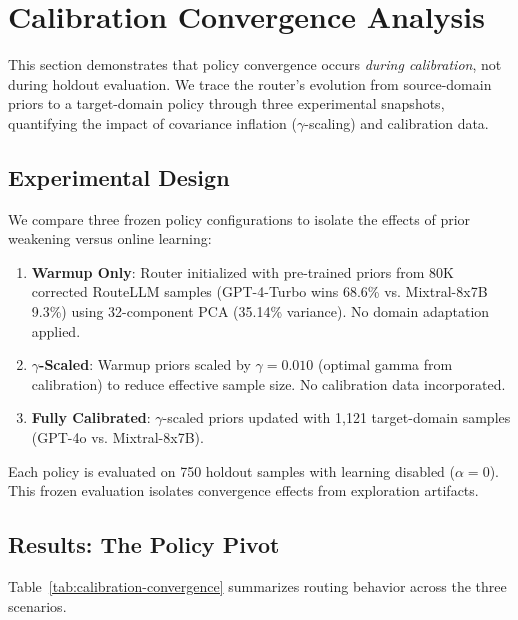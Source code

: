 \section{Calibration Convergence Analysis}
\label{sec:calibration-convergence}

This section demonstrates that policy convergence occurs \emph{during calibration}, not during holdout evaluation. We trace the router's evolution from source-domain priors to a target-domain policy through three experimental snapshots, quantifying the impact of covariance inflation ($\gamma$-scaling) and calibration data.

\subsection{Experimental Design}

We compare three frozen policy configurations to isolate the effects of prior weakening versus online learning:

\begin{enumerate}
    \item \textbf{Warmup Only}: Router initialized with pre-trained priors from 80K corrected RouteLLM samples (GPT-4-Turbo wins 68.6\% vs. Mixtral-8x7B 9.3\%) using 32-component PCA (35.14\% variance). No domain adaptation applied.
    \item \textbf{$\gamma$-Scaled}: Warmup priors scaled by $\gamma=0.010$ (optimal gamma from calibration) to reduce effective sample size. No calibration data incorporated.
    \item \textbf{Fully Calibrated}: $\gamma$-scaled priors updated with 1,121 target-domain samples (GPT-4o vs. Mixtral-8x7B).
\end{enumerate}

Each policy is evaluated on 750 holdout samples with learning disabled ($\alpha=0$). This frozen evaluation isolates convergence effects from exploration artifacts.

\subsection{Results: The Policy Pivot}

Table~\ref{tab:calibration-convergence} summarizes routing behavior across the three scenarios.

